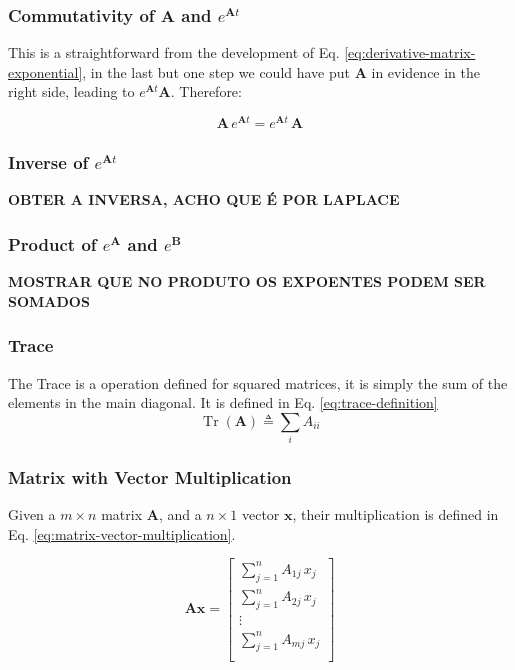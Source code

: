 \documentclass[12pt]{article}
\newcommand{\bvec}[1]{\mathbf{#1}} %
\newcommand{\mat}[1]{\mathbf{#1}}
\DeclareMathOperator{\Tr}{Tr}
\begin{document}
\subsubsection{Commutativity of $\mathbf{A}$ and $e^{\mathbf{A}t}$}
This is a straightforward from the development of Eq. \ref{eq:derivative-matrix-exponential}, in the last but one step we could have put $\mathbf{A}$ in evidence in the right side, leading to $e^{\mathbf{A}t}\mathbf{A}$. Therefore:

\begin{equation}
\mathbf{A} \, e^{\mathbf{A} t} = e^{\mathbf{A} t} \, \mathbf{A} 
\label{eq:commutativity-exp-of-a-and-a}
\end{equation}

\subsubsection{Inverse of $e^{\mathbf{A}t}$}
\color{blue}
\textbf{OBTER A INVERSA, ACHO QUE É POR LAPLACE}
\color{black}

\subsubsection{Product of $e^{\mathbf{A}}$ and $e^{\mathbf{B}}$}
\color{blue}
\textbf{MOSTRAR QUE NO PRODUTO OS EXPOENTES PODEM SER SOMADOS}
\color{black}

\subsubsection{Trace}
The Trace is a operation defined for squared matrices, it is simply the sum of the elements in the main diagonal. It is defined in Eq. \ref{eq:trace-definition}
\begin{equation}
    \Tr(\mat{A}) \triangleq \sum\limits_{i} A_{ii}
    \label{eq:trace-definition}
\end{equation}

\subsubsection{Matrix with Vector Multiplication}
Given a $m\times n$ matrix $\mat{A}$, and a $n\times 1$ vector $\bvec{x}$, their multiplication is defined in Eq. \ref{eq:matrix-vector-multiplication}.

\begin{equation}
    \mat{A} \bvec{x} = \begin{bmatrix}
        \sum\limits_{j=1}^{n} A_{1j} \,x_j \\
        \sum\limits_{j=1}^{n} A_{2j} \,x_j \\
        \vdots \\
        \sum\limits_{j=1}^{n} A_{mj} \,x_j \\
    \end{bmatrix}
    \label{eq:matrix-vector-multiplication}
\end{equation}
\end{document}
